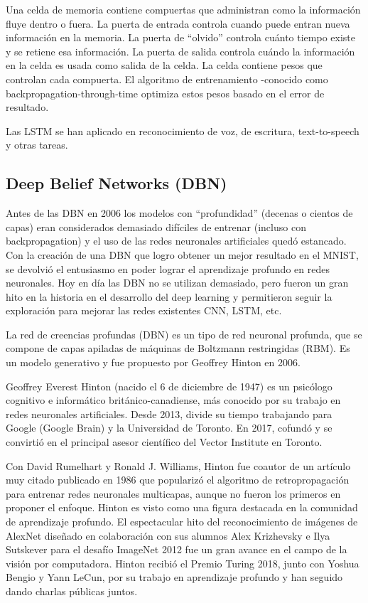 \documentclass[a4paper]{article}
\begin{document}
Una celda de memoria contiene compuertas que administran como la información fluye dentro 
o fuera. La puerta de entrada controla cuando puede entran nueva información en la memoria. 
La puerta de ``olvido'' controla cuánto tiempo existe y se retiene esa información. La puerta 
de salida controla cuándo la información en la celda es usada como salida de la celda. La 
celda contiene pesos que controlan cada compuerta. El algoritmo de entrenamiento -conocido 
como backpropagation-through-time optimiza estos pesos basado en el error de resultado.

Las LSTM se han aplicado en reconocimiento de voz, de escritura, text-to-speech y otras tareas.


\subsection{Deep Belief Networks (DBN)}
Antes de las DBN en 2006 los modelos con ``profundidad'' (decenas o cientos de capas) eran 
considerados demasiado difíciles de entrenar (incluso con backpropagation) y el uso de las 
redes neuronales artificiales quedó estancado. Con la creación de una DBN que logro obtener 
un mejor resultado en el MNIST, se devolvió el entusiasmo en poder lograr el aprendizaje 
profundo en redes neuronales. Hoy en día las DBN no se utilizan demasiado, pero fueron un 
gran hito en la historia en el desarrollo del deep learning y permitieron seguir la 
exploración para mejorar las redes existentes CNN, LSTM, etc.

La red de creencias profundas (DBN) es un tipo de red neuronal profunda, que se compone de 
capas apiladas de máquinas de Boltzmann restringidas (RBM). Es un modelo generativo y fue 
propuesto por Geoffrey Hinton en 2006.

Geoffrey Everest Hinton (nacido el 6 de diciembre de 1947) es un psicólogo cognitivo e 
informático británico-canadiense, más conocido por su trabajo en redes neuronales artificiales. 
Desde 2013, divide su tiempo trabajando para Google (Google Brain) y la Universidad de 
Toronto. En 2017, cofundó y se convirtió en el principal asesor científico del Vector 
Institute en Toronto.

Con David Rumelhart y Ronald J. Williams, Hinton fue coautor de un artículo muy citado 
publicado en 1986 que popularizó el algoritmo de retropropagación para entrenar redes 
neuronales multicapas, aunque no fueron los primeros en proponer el enfoque. Hinton es 
visto como una figura destacada en la comunidad de aprendizaje profundo. El espectacular 
hito del reconocimiento de imágenes de AlexNet diseñado en colaboración con sus alumnos 
Alex Krizhevsky e Ilya Sutskever para el desafío ImageNet 2012 fue un gran avance en el 
campo de la visión por computadora.
Hinton recibió el Premio Turing 2018, junto con Yoshua Bengio y Yann LeCun, por su trabajo 
en aprendizaje profundo y han seguido dando charlas públicas juntos.
\end{document}
